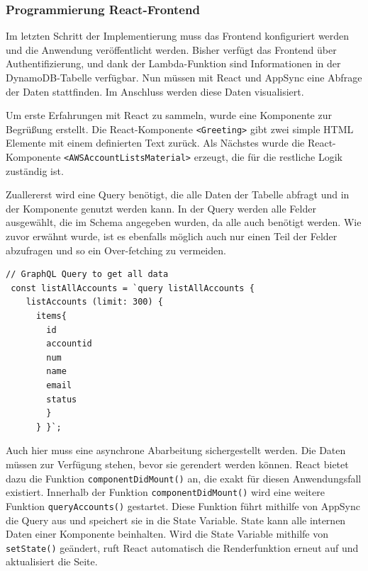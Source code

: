 \subsubsection{Programmierung React-Frontend}
\label{ReactFrontend}
Im letzten Schritt der Implementierung muss das Frontend konfiguriert werden und die Anwendung veröffentlicht werden.
Bisher verfügt das Frontend über Authentifizierung, und dank der Lambda-Funktion sind Informationen in der DynamoDB-Tabelle verfügbar.
Nun müssen mit React und AppSync eine Abfrage der Daten stattfinden.
Im Anschluss werden diese Daten visualisiert.

Um erste Erfahrungen mit React zu sammeln, wurde eine Komponente zur Begrüßung erstellt.
Die React-Komponente \verb+<Greeting>+ gibt zwei simple HTML Elemente mit einem definierten Text zurück.
Als Nächstes wurde die React-Komponente \verb+<AWSAccountListsMaterial>+ erzeugt, die für die restliche Logik zuständig ist.

Zuallererst wird eine Query benötigt, die alle Daten der Tabelle abfragt und in der Komponente genutzt werden kann.
In der Query werden alle Felder ausgewählt, die im Schema angegeben wurden, da alle auch benötigt werden.
Wie zuvor erwähnt wurde, ist es ebenfalls möglich auch nur einen Teil der Felder abzufragen und so ein Over-fetching zu vermeiden.

\begin{lstlisting}[basicstyle=\ttfamily\small, breaklines=true , frame = single, backgroundcolor=\color{flashwhite},caption={Query zum Accountaufruf (Datei: \textit{\nameref{lst:React AccountList}} )} ]
// GraphQL Query to get all data
 const listAllAccounts = `query listAllAccounts {
    listAccounts (limit: 300) {
      items{
        id
        accountid
        num
        name
        email
        status
        }
      } }`;
    \end{lstlisting}



Auch hier muss eine asynchrone Abarbeitung sichergestellt werden.
Die Daten müssen zur Verfügung stehen, bevor sie gerendert werden können.
React bietet dazu die Funktion \verb+componentDidMount()+ an, die exakt für diesen Anwendungsfall existiert. \cite[]{ReactComp}
Innerhalb der Funktion \verb+componentDidMount()+ wird eine weitere Funktion \verb+queryAccounts()+ gestartet.
Diese Funktion führt mithilfe von AppSync die Query aus und speichert sie in die State Variable.\cite[]{AmplifyAPI}
State kann alle internen Daten einer Komponente beinhalten.
Wird die State Variable mithilfe von \verb+setState()+ geändert, ruft React automatisch die Renderfunktion erneut auf und aktualisiert die Seite.

